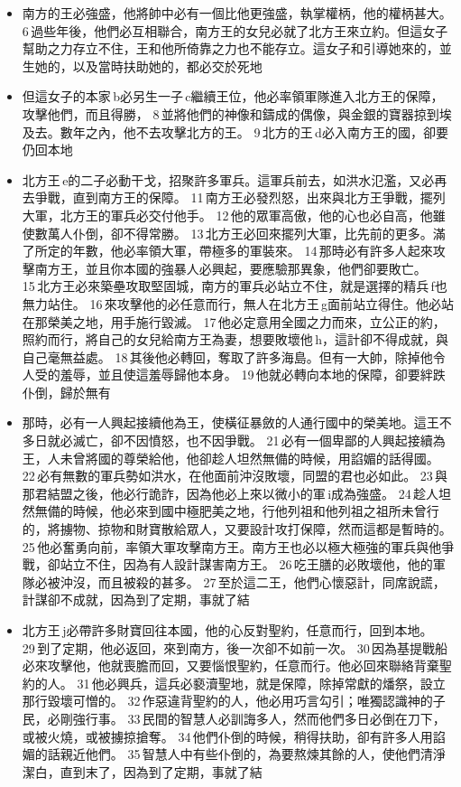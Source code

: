 \iffalse
\begin{itemize}
\itemsep-.45em  
\item 南方的王必強盛，他將帥中必有一個比他更強盛，執掌權柄，他的權柄甚大。 6 過些年後，他們必互相聯合，南方王的女兒必就了北方王來立約。但這女子幫助之力存立不住，王和他所倚靠之力也不能存立。這女子和引導她來的，並生她的，以及當時扶助她的，都必交於死地
\item 但這女子的本家 b必另生一子 c繼續王位，他必率領軍隊進入北方王的保障，攻擊他們，而且得勝， 8 並將他們的神像和鑄成的偶像，與金銀的寶器掠到埃及去。數年之內，他不去攻擊北方的王。 9 北方的王 d必入南方王的國，卻要仍回本地
\item 北方王 e的二子必動干戈，招聚許多軍兵。這軍兵前去，如洪水氾濫，又必再去爭戰，直到南方王的保障。 11 南方王必發烈怒，出來與北方王爭戰，擺列大軍，北方王的軍兵必交付他手。 12 他的眾軍高傲，他的心也必自高，他雖使數萬人仆倒，卻不得常勝。 13 北方王必回來擺列大軍，比先前的更多。滿了所定的年數，他必率領大軍，帶極多的軍裝來。 14 那時必有許多人起來攻擊南方王，並且你本國的強暴人必興起，要應驗那異象，他們卻要敗亡。 15 北方王必來築壘攻取堅固城，南方的軍兵必站立不住，就是選擇的精兵 f也無力站住。 16 來攻擊他的必任意而行，無人在北方王 g面前站立得住。他必站在那榮美之地，用手施行毀滅。 17 他必定意用全國之力而來，立公正的約，照約而行，將自己的女兒給南方王為妻，想要敗壞他 h，這計卻不得成就，與自己毫無益處。 18 其後他必轉回，奪取了許多海島。但有一大帥，除掉他令人受的羞辱，並且使這羞辱歸他本身。 19 他就必轉向本地的保障，卻要絆跌仆倒，歸於無有
\item 那時，必有一人興起接續他為王，使橫征暴斂的人通行國中的榮美地。這王不多日就必滅亡，卻不因憤怒，也不因爭戰。 21 必有一個卑鄙的人興起接續為王，人未曾將國的尊榮給他，他卻趁人坦然無備的時候，用諂媚的話得國。 22 必有無數的軍兵勢如洪水，在他面前沖沒敗壞，同盟的君也必如此。 23 與那君結盟之後，他必行詭詐，因為他必上來以微小的軍 i成為強盛。 24 趁人坦然無備的時候，他必來到國中極肥美之地，行他列祖和他列祖之祖所未曾行的，將擄物、掠物和財寶散給眾人，又要設計攻打保障，然而這都是暫時的。 25 他必奮勇向前，率領大軍攻擊南方王。南方王也必以極大極強的軍兵與他爭戰，卻站立不住，因為有人設計謀害南方王。 26 吃王膳的必敗壞他，他的軍隊必被沖沒，而且被殺的甚多。 27 至於這二王，他們心懷惡計，同席說謊，計謀卻不成就，因為到了定期，事就了結
\item 北方王 j必帶許多財寶回往本國，他的心反對聖約，任意而行，回到本地。 29 到了定期，他必返回，來到南方，後一次卻不如前一次。 30 因為基提戰船必來攻擊他，他就喪膽而回，又要惱恨聖約，任意而行。他必回來聯絡背棄聖約的人。 31 他必興兵，這兵必褻瀆聖地，就是保障，除掉常獻的燔祭，設立那行毀壞可憎的。 32 作惡違背聖約的人，他必用巧言勾引；唯獨認識神的子民，必剛強行事。 33 民間的智慧人必訓誨多人，然而他們多日必倒在刀下，或被火燒，或被擄掠搶奪。 34 他們仆倒的時候，稍得扶助，卻有許多人用諂媚的話親近他們。 35 智慧人中有些仆倒的，為要熬煉其餘的人，使他們清淨潔白，直到末了，因為到了定期，事就了結

\end{itemize}
